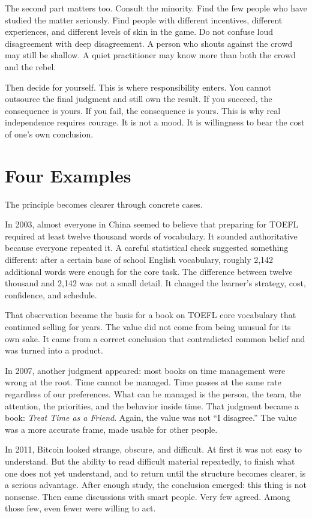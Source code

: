 The second part matters too. Consult the minority. Find the few people who have studied the matter seriously. Find people with different incentives, different experiences, and different levels of skin in the game. Do not confuse loud disagreement with deep disagreement. A person who shouts against the crowd may still be shallow. A quiet practitioner may know more than both the crowd and the rebel.

Then decide for yourself. This is where responsibility enters. You cannot outsource the final judgment and still own the result. If you succeed, the consequence is yours. If you fail, the consequence is yours. This is why real independence requires courage. It is not a mood. It is willingness to bear the cost of one's own conclusion.

\section*{Four Examples}

The principle becomes clearer through concrete cases.

In 2003, almost everyone in China seemed to believe that preparing for TOEFL required at least twelve thousand words of vocabulary. It sounded authoritative because everyone repeated it. A careful statistical check suggested something different: after a certain base of school English vocabulary, roughly 2,142 additional words were enough for the core task. The difference between twelve thousand and 2,142 was not a small detail. It changed the learner's strategy, cost, confidence, and schedule.

That observation became the basis for a book on TOEFL core vocabulary that continued selling for years. The value did not come from being unusual for its own sake. It came from a correct conclusion that contradicted common belief and was turned into a product.

In 2007, another judgment appeared: most books on time management were wrong at the root. Time cannot be managed. Time passes at the same rate regardless of our preferences. What can be managed is the person, the team, the attention, the priorities, and the behavior inside time. That judgment became a book: \emph{Treat Time as a Friend}. Again, the value was not ``I disagree.'' The value was a more accurate frame, made usable for other people.

In 2011, Bitcoin looked strange, obscure, and difficult. At first it was not easy to understand. But the ability to read difficult material repeatedly, to finish what one does not yet understand, and to return until the structure becomes clearer, is a serious advantage. After enough study, the conclusion emerged: this thing is not nonsense. Then came discussions with smart people. Very few agreed. Among those few, even fewer were willing to act.


